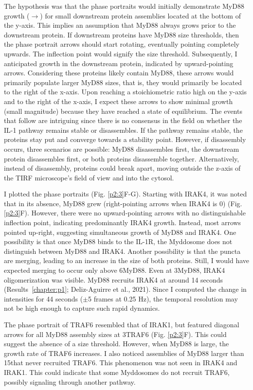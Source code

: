The hypothesis was that the phase portraits would initially demonstrate MyD88 growth ($\rightarrow$) for small downstream protein assemblies located at the bottom of the y-axis. This implies an assumption that MyD88 always grows prior to the downstream protein. If downstream proteins have MyD88 size thresholds, then the phase portrait arrows should start rotating, eventually pointing completely upwards. The inflection point would signify the size threshold. Subsequently, I anticipated growth in the downstream protein, indicated by upward-pointing arrows. Considering these proteins likely contain MyD88, these arrows would primarily populate larger MyD88 sizes, that is, they would primarily be located to the right of the x-axis. Upon reaching a stoichiometric ratio high on the y-axis and to the right of the x-axis, I expect these arrows to show minimal growth (small magnitude) because they have reached a state of equilibrium. The events that follow are intriguing since there is no consensus in the field on whether the IL-1 pathway remains stable or disassembles. If the pathway remains stable, the proteins stay put and converge towards a stability point. However, if disassembly occurs, three scenarios are possible: MyD88 disassembles first, the downstream protein disassembles first, or both proteins disassemble together. Alternatively, instead of disassembly, proteins could break apart, moving outside the z-axis of the TIRF microscope’s field of view and into the cytosol.

I plotted the phase portraits (Fig. \ref{p2:3}F-G). Starting with IRAK4, it was noted that in its absence, MyD88 grew (right-pointing arrows when IRAK4 is 0) (Fig. \ref{p2:3}F). However, there were no upward-pointing arrows with no distinguishable inflection point, indicating predominantly IRAK4 growth. Instead, most arrows pointed up-right, suggesting simultaneous growth of MyD88 and IRAK4. One possibility is that once MyD88 binds to the IL-1R, the Myddosome does not distinguish between MyD88 and IRAK4. Another possibility is that the puncta are merging, leading to an increase in the size of both proteins. Still, I would have expected merging to occur only above 6\times MyD88. Even at 3\times MyD88, IRAK4 oligomerization was visible. MyD88 recruits IRAK4 at around 14 seconds (Results~\ref{chapter:p1}; Deliz-Aguirre et al., 2021). Since I computed the change in intensities for 44 seconds ($\pm$5 frames at 0.25 Hz), the temporal resolution may not be high enough to capture such rapid dynamics.

The phase portrait of TRAF6 resembled that of IRAK1, but featured diagonal arrows for all MyD88 assembly sizes at 3\times TRAF6 (Fig. \ref{p2:3}F). This could suggest the absence of a size threshold. However, when MyD88 is large, the growth rate of TRAF6 increases. I also noticed assemblies of MyD88 larger than 15\times that never recruited TRAF6. This phenomenon was not seen in IRAK4 and IRAK1. This could indicate that some Myddosomes do not recruit TRAF6, possibly signaling through another pathway.

